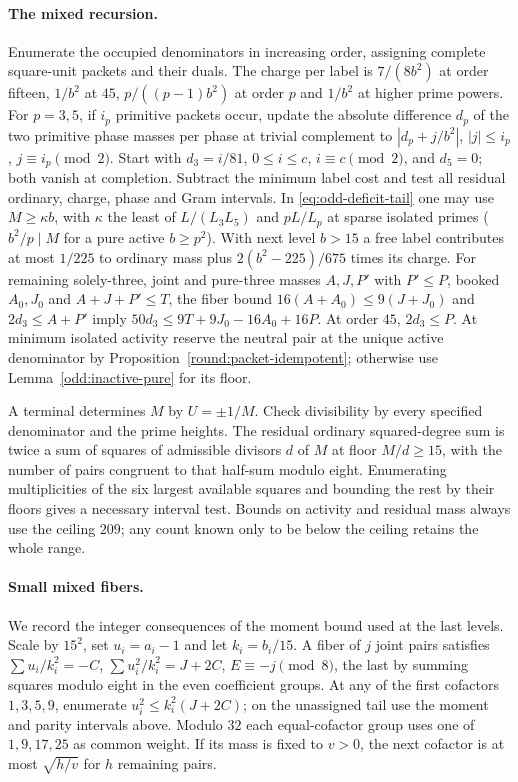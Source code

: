 \documentclass[11pt]{amsart}
\numberwithin{equation}{section}
\theoremstyle{definition}
\theoremstyle{plain}
\begin{document}
\paragraph{The mixed recursion.}
Enumerate the occupied denominators in increasing order, assigning
complete square-unit packets and their duals. The charge per label is
$7/(8b^2)$ at order fifteen, $1/b^2$ at $45$, $p/((p-1)b^2)$ at order
$p$ and $1/b^2$ at higher prime powers. For $p=3,5$, if $i_p$ primitive
packets occur, update the absolute difference $d_p$ of the two
primitive phase masses per phase at trivial complement to
$|d_p+j/b^2|$, $|j|\le i_p$, $j\equiv i_p\pmod2$.
Start with $d_3=i/81$, $0\le i\le c$, $i\equiv c\pmod2$, and $d_5=0$;
both vanish at completion. Subtract the minimum label cost and test
all residual ordinary, charge, phase and Gram intervals. In
\eqref{eq:odd-deficit-tail} one may use $M\ge\kappa b$, with $\kappa$
the least of $L/(L_3L_5)$ and $pL/L_p$ at sparse isolated primes
($b^2/p\mid M$ for a pure active $b\ge p^2$). With next level $b>15$
a free label contributes at most $1/225$ to ordinary mass plus
$2(b^2-225)/675$ times its charge. For remaining solely-three,
joint and pure-three masses $A,J,P'$ with $P'\le P$, booked
$A_0,J_0$ and $A+J+P'\le T$, the fiber bound
$16(A+A_0)\le9(J+J_0)$ and $2d_3\le A+P'$ imply
$50d_3\le9T+9J_0-16A_0+16P$. At order $45$, $2d_3\le P$.
At minimum isolated activity reserve the neutral pair at the unique
active denominator by Proposition~\ref{round:packet-idempotent};
otherwise use Lemma~\ref{odd:inactive-pure} for its floor.

A terminal determines $M$ by $U=\pm1/M$. Check divisibility by every
specified denominator and the prime heights. The residual ordinary
squared-degree sum is twice a sum of squares of admissible divisors
$d$ of $M$ at floor $M/d\ge15$, with the number of pairs congruent to
that half-sum modulo eight. Enumerating multiplicities of the six
largest available squares and bounding the rest by their floors gives
a necessary interval test. Bounds on activity and residual mass always
use the ceiling $209$; any count known only to be below the ceiling
retains the whole range.

\paragraph{Small mixed fibers.}
We record the integer consequences of the moment bound used at the last
levels. Scale by $15^2$, set $u_i=a_i-1$ and let $k_i=b_i/15$.
A fiber of $j$ joint pairs satisfies
$\sum u_i/k_i^2=-C$, $\sum u_i^2/k_i^2=J+2C$, $E\equiv-j\pmod8$,
the last by summing squares modulo eight in the even coefficient groups.
At any of the first cofactors $1,3,5,9$, enumerate
$u_i^2\le k_i^2(J+2C)$; on the unassigned tail use the moment and parity
intervals above. Modulo $32$ each equal-cofactor group uses one of
$1,9,17,25$ as common weight. If its mass is fixed to $v>0$, the next
cofactor is at most $\sqrt{h/v}$ for $h$ remaining pairs.
\end{document}
